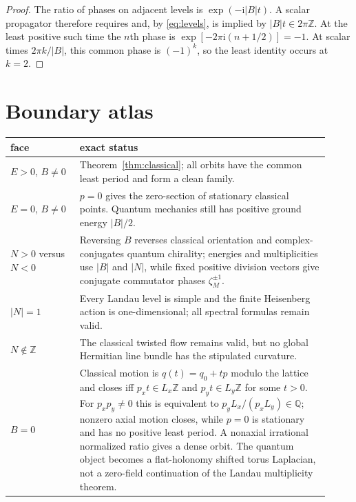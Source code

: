 \documentclass[10pt]{article}
\newcommand{\ZZ}{\mathbb Z}
\newcommand{\ii}{\mathrm i}
\begin{document}
\begin{proof}
The ratio of phases on adjacent levels is $\exp(-\ii|B|t)$.  A scalar
propagator therefore requires and, by \eqref{eq:levels}, is implied by
$|B|t\in2\pi\ZZ$.  At the least positive such time the $n$th phase is
$\exp[-2\pi\ii(n+1/2)]=-1$.  At scalar times $2\pi k/|B|$, this common phase
is $(-1)^k$, so the least identity occurs at $k=2$.
\end{proof}

\section{Boundary atlas}

\begin{center}
\begin{tabular}{>{\raggedright\arraybackslash}p{0.20\linewidth}
                >{\raggedright\arraybackslash}p{0.72\linewidth}}
\toprule
face & exact status\\
\midrule
$E>0$, $B\ne0$ & Theorem~\ref{thm:classical}; all orbits have the common
least period and form a clean family.\\
$E=0$, $B\ne0$ & $p=0$ gives the zero-section of stationary classical
points.  Quantum mechanics still has positive ground energy $|B|/2$.\\
$N>0$ versus $N<0$ & Reversing $B$ reverses classical orientation and
complex-conjugates quantum chirality; energies and multiplicities use
$|B|$ and $|N|$, while fixed positive division vectors give conjugate
commutator phases $\zeta_M^{\pm1}$.\\
$|N|=1$ & Every Landau level is simple and the finite Heisenberg action is
one-dimensional; all spectral formulas remain valid.\\
$N\notin\ZZ$ & The classical twisted flow remains valid, but no global
Hermitian line bundle has the stipulated curvature.\\
$B=0$ & Classical motion is $q(t)=q_0+tp$ modulo the lattice and closes iff
$p_xt\in L_x\ZZ$ and $p_yt\in L_y\ZZ$ for some $t>0$.  For $p_xp_y\ne0$
this is equivalent to $p_yL_x/(p_xL_y)\in\mathbb Q$; nonzero axial motion
closes, while $p=0$ is stationary and has no positive least period.  A
nonaxial irrational normalized ratio gives a dense orbit.  The quantum
object becomes a flat-holonomy shifted torus Laplacian, not a zero-field
continuation of the Landau multiplicity theorem.\\
\bottomrule
\end{tabular}
\end{center}
\end{document}
